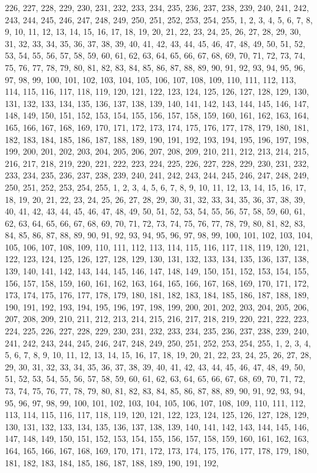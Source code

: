 226, 227, 228, 229, 230, 231, 232, 233, 234, 235, 236, 237, 238, 239, 240, 241, 242, 243, 244, 245, 246, 247, 248, 249, 250, 251, 252, 253, 254, 255, 1, 2, 3, 4, 5, 6, 7, 8, 9, 10, 11, 12, 13, 14, 15, 16, 17, 18, 19, 20, 21, 22, 23, 24, 25, 26, 27, 28, 29, 30, 31, 32, 33, 34, 35, 36, 37, 38, 39, 40, 41, 42, 43, 44, 45, 46, 47, 48, 49, 50, 51, 52, 53, 54, 55, 56, 57, 58, 59, 60, 61, 62, 63, 64, 65, 66, 67, 68, 69, 70, 71, 72, 73, 74, 75, 76, 77, 78, 79, 80, 81, 82, 83, 84, 85, 86, 87, 88, 89, 90, 91, 92, 93, 94, 95, 96, 97, 98, 99, 100, 101, 102, 103, 104, 105, 106, 107, 108, 109, 110, 111, 112, 113, 114, 115, 116, 117, 118, 119, 120, 121, 122, 123, 124, 125, 126, 127, 128, 129, 130, 131, 132, 133, 134, 135, 136, 137, 138, 139, 140, 141, 142, 143, 144, 145, 146, 147, 148, 149, 150, 151, 152, 153, 154, 155, 156, 157, 158, 159, 160, 161, 162, 163, 164, 165, 166, 167, 168, 169, 170, 171, 172, 173, 174, 175, 176, 177, 178, 179, 180, 181, 182, 183, 184, 185, 186, 187, 188, 189, 190, 191, 192, 193, 194, 195, 196, 197, 198, 199, 200, 201, 202, 203, 204, 205, 206, 207, 208, 209, 210, 211, 212, 213, 214, 215, 216, 217, 218, 219, 220, 221, 222, 223, 224, 225, 226, 227, 228, 229, 230, 231, 232, 233, 234, 235, 236, 237, 238, 239, 240, 241, 242, 243, 244, 245, 246, 247, 248, 249, 250, 251, 252, 253, 254, 255, 1, 2, 3, 4, 5, 6, 7, 8, 9, 10, 11, 12, 13, 14, 15, 16, 17, 18, 19, 20, 21, 22, 23, 24, 25, 26, 27, 28, 29, 30, 31, 32, 33, 34, 35, 36, 37, 38, 39, 40, 41, 42, 43, 44, 45, 46, 47, 48, 49, 50, 51, 52, 53, 54, 55, 56, 57, 58, 59, 60, 61, 62, 63, 64, 65, 66, 67, 68, 69, 70, 71, 72, 73, 74, 75, 76, 77, 78, 79, 80, 81, 82, 83, 84, 85, 86, 87, 88, 89, 90, 91, 92, 93, 94, 95, 96, 97, 98, 99, 100, 101, 102, 103, 104, 105, 106, 107, 108, 109, 110, 111, 112, 113, 114, 115, 116, 117, 118, 119, 120, 121, 122, 123, 124, 125, 126, 127, 128, 129, 130, 131, 132, 133, 134, 135, 136, 137, 138, 139, 140, 141, 142, 143, 144, 145, 146, 147, 148, 149, 150, 151, 152, 153, 154, 155, 156, 157, 158, 159, 160, 161, 162, 163, 164, 165, 166, 167, 168, 169, 170, 171, 172, 173, 174, 175, 176, 177, 178, 179, 180, 181, 182, 183, 184, 185, 186, 187, 188, 189, 190, 191, 192, 193, 194, 195, 196, 197, 198, 199, 200, 201, 202, 203, 204, 205, 206, 207, 208, 209, 210, 211, 212, 213, 214, 215, 216, 217, 218, 219, 220, 221, 222, 223, 224, 225, 226, 227, 228, 229, 230, 231, 232, 233, 234, 235, 236, 237, 238, 239, 240, 241, 242, 243, 244, 245, 246, 247, 248, 249, 250, 251, 252, 253, 254, 255, 1, 2, 3, 4, 5, 6, 7, 8, 9, 10, 11, 12, 13, 14, 15, 16, 17, 18, 19, 20, 21, 22, 23, 24, 25, 26, 27, 28, 29, 30, 31, 32, 33, 34, 35, 36, 37, 38, 39, 40, 41, 42, 43, 44, 45, 46, 47, 48, 49, 50, 51, 52, 53, 54, 55, 56, 57, 58, 59, 60, 61, 62, 63, 64, 65, 66, 67, 68, 69, 70, 71, 72, 73, 74, 75, 76, 77, 78, 79, 80, 81, 82, 83, 84, 85, 86, 87, 88, 89, 90, 91, 92, 93, 94, 95, 96, 97, 98, 99, 100, 101, 102, 103, 104, 105, 106, 107, 108, 109, 110, 111, 112, 113, 114, 115, 116, 117, 118, 119, 120, 121, 122, 123, 124, 125, 126, 127, 128, 129, 130, 131, 132, 133, 134, 135, 136, 137, 138, 139, 140, 141, 142, 143, 144, 145, 146, 147, 148, 149, 150, 151, 152, 153, 154, 155, 156, 157, 158, 159, 160, 161, 162, 163, 164, 165, 166, 167, 168, 169, 170, 171, 172, 173, 174, 175, 176, 177, 178, 179, 180, 181, 182, 183, 184, 185, 186, 187, 188, 189, 190, 191, 192, 